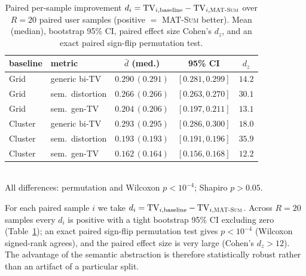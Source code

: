 \documentclass[sigconf,nonacm]{acmart}
\begin{document}

\begin{table}[t]
  \caption{Paired per-sample improvement $d_i=\mathrm{TV}_{i,\text{baseline}}-\mathrm{TV}_{i,\text{\textsc{MAT-Sum}}}$
  over $R{=}20$ paired user samples (positive $=$ \textsc{MAT-Sum} better). Mean (median), bootstrap 95\%
  CI, paired effect size Cohen's $d_z$, and an exact paired sign-flip permutation test.}
  \label{tab:paired}
  \small
  \begin{tabular}{@{}llccc@{}}
    \toprule
    baseline & metric & $\bar d$ (med.) & 95\% CI & $d_z$ \\
    \midrule
    Grid    & generic bi-TV     & $0.290\,(0.291)$ & $[0.281,0.299]$ & $14.2$ \\
    Grid    & sem.\ distortion  & $0.266\,(0.266)$ & $[0.263,0.270]$ & $30.1$ \\
    Grid    & sem.\ gen-TV      & $0.204\,(0.206)$ & $[0.197,0.211]$ & $13.1$ \\
    Cluster & generic bi-TV     & $0.293\,(0.295)$ & $[0.286,0.300]$ & $18.0$ \\
    Cluster & sem.\ distortion  & $0.193\,(0.193)$ & $[0.191,0.196]$ & $35.9$ \\
    Cluster & sem.\ gen-TV      & $0.162\,(0.164)$ & $[0.156,0.168]$ & $12.2$ \\
    \bottomrule
  \end{tabular}
  \\[2pt]\footnotesize All differences: permutation and Wilcoxon $p<10^{-4}$; Shapiro $p>0.05$.
\end{table}

For each paired sample $i$ we take $d_i=\mathrm{TV}_{i,\text{baseline}}-\mathrm{TV}_{i,\textsc{MAT-Sum}}$.
Across $R{=}20$ samples every $d_i$ is positive with a tight bootstrap 95\% CI excluding zero
(Table~\ref{tab:paired}); an exact paired sign-flip permutation test gives $p<10^{-4}$ (Wilcoxon
signed-rank agrees), and the paired effect size is very large (Cohen's $d_z>12$). The advantage of
the semantic abstraction is therefore statistically robust rather than an artifact of a particular split.
\end{document}
